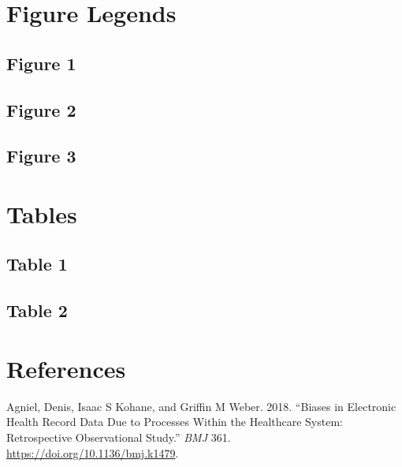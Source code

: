 \documentclass[
]{article}
\newlength{\cslhangindent}
\newenvironment{cslreferences}%
  {\setlength{\parindent}{0pt}%
  \everypar{\setlength{\hangindent}{\cslhangindent}}\ignorespaces}%
  {\par}
\begin{document}
\hypertarget{figure-legends}{%
\section{Figure Legends}\label{figure-legends}}

\hypertarget{figure-1}{%
\subsection{Figure 1}\label{figure-1}}

\hypertarget{figure-2}{%
\subsection{Figure 2}\label{figure-2}}

\hypertarget{figure-3}{%
\subsection{Figure 3}\label{figure-3}}

\hypertarget{tables}{%
\section{Tables}\label{tables}}

\hypertarget{table-1}{%
\subsection{Table 1}\label{table-1}}

\hypertarget{table-2}{%
\subsection{Table 2}\label{table-2}}

\hypertarget{references}{%
\section*{References}\label{references}}

\hypertarget{refs}{}
\begin{cslreferences}
\leavevmode\hypertarget{ref-Agniel2018}{}%
Agniel, Denis, Isaac S Kohane, and Griffin M Weber. 2018. ``Biases in
Electronic Health Record Data Due to Processes Within the Healthcare
System: Retrospective Observational Study.'' \emph{BMJ} 361.
\url{https://doi.org/10.1136/bmj.k1479}.
\end{cslreferences}
\end{document}
